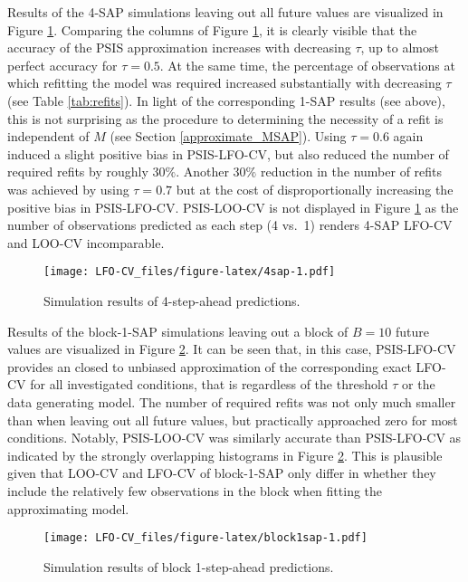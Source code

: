 \documentclass[american,]{article}
\begin{document}
Results of the 4-SAP simulations leaving out all future values are visualized in
Figure \ref{fig:4sap}. Comparing the columns of Figure \ref{fig:4sap}, it is
clearly visible that the accuracy of the PSIS approximation increases with
decreasing \(\tau\), up to almost perfect accuracy for \(\tau = 0.5\). At the same
time, the percentage of observations at which refitting the model was required
increased substantially with decreasing \(\tau\) (see Table \ref{tab:refits}). In
light of the corresponding 1-SAP results (see above), this is not surprising as
the procedure to determining the necessity of a refit is independent of \(M\) (see
Section \ref{approximate_MSAP}). Using \(\tau = 0.6\) again induced a slight
positive bias in PSIS-LFO-CV, but also reduced the number of required refits by
roughly \(30\%\). Another \(30\%\) reduction in the number of refits was achieved by
using \(\tau = 0.7\) but at the cost of disproportionally increasing the positive
bias in PSIS-LFO-CV. PSIS-LOO-CV is not displayed in Figure \ref{fig:4sap} as
the number of observations predicted as each step (4 vs.~1) renders 4-SAP LFO-CV
and LOO-CV incomparable.

\begin{figure}
\centering
\texttt{[image: LFO-CV\_files/figure-latex/4sap-1.pdf]}
\caption{\label{fig:4sap}Simulation results of 4-step-ahead predictions.}
\end{figure}

Results of the block-1-SAP simulations leaving out a block of \(B = 10\) future
values are visualized in Figure \ref{fig:block1sap}. It can be seen that, in
this case, PSIS-LFO-CV provides an closed to unbiased approximation of the
corresponding exact LFO-CV for all investigated conditions, that is regardless
of the threshold \(\tau\) or the data generating model. The number of required
refits was not only much smaller than when leaving out all future values, but
practically approached zero for most conditions. Notably, PSIS-LOO-CV was
similarly accurate than PSIS-LFO-CV as indicated by the strongly overlapping
histograms in Figure \ref{fig:block1sap}. This is plausible given that LOO-CV
and LFO-CV of block-1-SAP only differ in whether they include the relatively few
observations in the block when fitting the approximating model.

\begin{figure}
\centering
\texttt{[image: LFO-CV\_files/figure-latex/block1sap-1.pdf]}
\caption{\label{fig:block1sap}Simulation results of block 1-step-ahead predictions.}
\end{figure}
\end{document}
